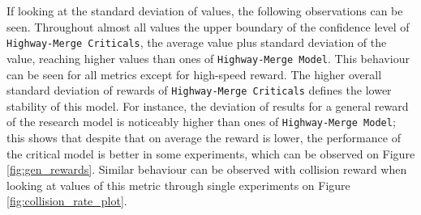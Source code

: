 If looking at the standard deviation of values, the following observations can be seen. Throughout almost all values the upper boundary of the confidence level of \texttt{Highway-Merge Criticals}, the average value plus standard deviation of the value, reaching higher values than ones of \texttt{Highway-Merge Model}. This behaviour can be seen for all metrics except for high-speed reward. The higher overall standard deviation of rewards of \texttt{Highway-Merge Criticals} defines the lower stability of this model. For instance, the deviation of results for a general reward of the research model is noticeably higher than ones of \texttt{Highway-Merge Model}; this shows that despite that on average the reward is lower, the performance of the critical model is better in some experiments, which can be observed on Figure \ref{fig:gen_rewards}. Similar behaviour can be observed with collision reward when looking at values of this metric through single experiments on Figure \ref{fig:collision_rate_plot}.